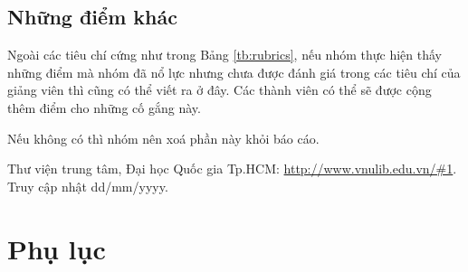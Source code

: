 \documentclass[a4paper]{article}
\begin{document}
\subsection{Những điểm khác}
Ngoài các tiêu chí cứng như trong Bảng \ref{tb:rubrics}, nếu nhóm thực hiện thấy những điểm mà nhóm đã nổ lực nhưng chưa được đánh giá trong các tiêu chí của giảng viên thì cũng có thể viết ra ở đây. Các thành viên có thể sẽ được cộng thêm điểm cho những cố gắng này.

Nếu không có thì nhóm nên xoá phần này khỏi báo cáo.




\begin{thebibliography}{99999}
 {Thư viện trung tâm, Đại học Quốc gia Tp.HCM: \url{http://www.vnulib.edu.vn/#1}}. Truy cập nhật dd/mm/yyyy.
\end{thebibliography} 
\newpage
\newpage
\section{Phụ lục}
\end{document}
